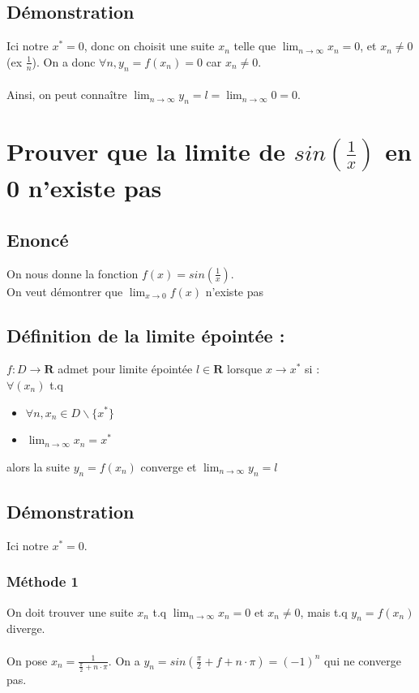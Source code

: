 \documentclass{article}
\begin{document}
\subsection{Démonstration}
Ici notre $ x^* = 0 $, donc on choisit une suite $ x_n $ telle que $ \lim_{n\to\infty} x_n = 0$, et $ x_n \neq 0$ (ex $\frac{1}{n}$). On a donc $ \forall n, y_n = f(x_n) = 0 $ car $x_n \neq 0$.\\\\
Ainsi, on peut connaître $ \lim_{n\to\infty} y_n = l = \lim_{n\to\infty} 0 = 0$.

\newpage
\section{Prouver que la limite de $ sin(\frac{1}{x}) $ en 0 n'existe pas}

\subsection{Enoncé}
On nous donne la fonction $ f(x) = sin(\frac{1}{x}) $.\\
On veut démontrer que $ \lim_{x\to{0}} f(x) $ n'existe pas
\subsection{Définition de la limite épointée :}
$ f : D \to \mathbf{R} $ admet pour limite épointée $ l \in \mathbf{R} $ lorsque $ x \to x^* $ si :\\
$ \forall (x_n) $ t.q
\begin{itemize}
    \item $\forall n, x_n \in D \backslash \{x^*\} $
    \item $ \lim_{n\to\infty} x_n = x^*$
\end{itemize}
alors la suite $ y_n = f(x_n) $ converge et $ \lim_{n\to\infty} y_n = l$
\subsection{Démonstration}
Ici notre $ x^* = 0 $. 
\subsubsection{Méthode 1}
On doit trouver une suite $ x_n $ t.q $ \lim_{n\to\infty}x_n= 0 $ et $ x_n \neq 0$, mais t.q $ y_n = f(x_n) $ diverge.\\\\
On pose $ x_n = \frac{1}{\frac{\pi}{2} + n \cdot \pi}$. On a $ y_n = sin(\frac{\pi}{2} + f+n \cdot \pi) = (-1)^n $ qui ne converge pas.
\end{document}
